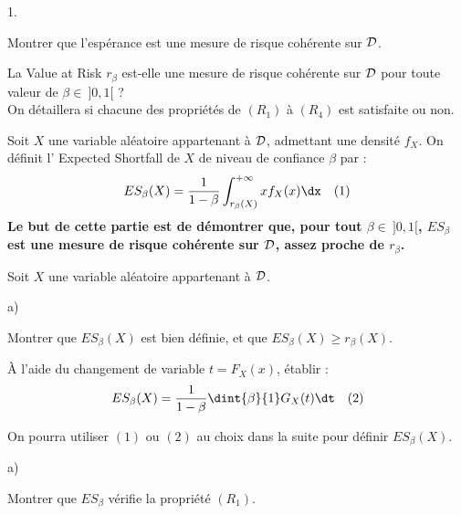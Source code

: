 \begin{noliste}{1.}
  \setlength{\itemsep}{4mm}
  \setcounter{enumi}{11}
  \item Montrer que l'espérance est une mesure de risque cohérente 
  sur ${\cal D}$.
  
  
  
  

  
  \item La \og Value at Risk \fg{} $r_\beta$ est-elle une mesure de 
  risque cohérente sur ${\cal D}$ pour toute valeur de $\beta \in \
  ]0,1[$ ?\\
  On détaillera si chacune des propriétés de $(R_1)$ à $(R_4)$ est 
  satisfaite ou non.
  
  

  Soit $X$ une variable aléatoire appartenant à ${\cal D}$, 
  admettant une densité $f_X$. On définit l' \og Expected 
  Shortfall\fg{} de $X$ de niveau de confiance $\beta$ par :
  \[
    ES_\beta(X)=\dfrac1{1-\beta} \int_{r_\beta(X)}^{+\infty} x 
    f_X(x) \dx \quad(1)
  \]
  {\bf Le but de cette partie est de démontrer que, pour tout 
  $\beta \in \ ]0,1[$, $ES_\beta$ est une mesure de risque cohérente 
  sur ${\cal D}$, assez \og proche \fg{} de $r_\beta$.}
  
  
  \newpage
  
  
  \item Soit $X$ une variable aléatoire appartenant à ${\cal D}$.
  \begin{noliste}{a)}
    \setlength{\itemsep}{2mm}
    \item Montrer que $ES_\beta(X)$ est bien définie, et que 
    $ES_\beta(X) \geq r_\beta(X)$.
    
    
    
    \item À l'aide du changement de variable $t=F_X(x)$, établir :
    \[
      ES_\beta(X)=\dfrac{1}{1-\beta} \dint{\beta}{1} G_X(t) \dt 
      \quad (2)
    \]
    
    
  \end{noliste}
  
  
  
  
  On pourra utiliser $(1)$ ou $(2)$ au choix dans la suite pour 
  définir $ES_\beta(X)$.
  
  \item
  \begin{noliste}{a)}
    \setlength{\itemsep}{2mm}
    \item Montrer que $ES_\beta$ vérifie la propriété $(R_1)$.
    

\end{noliste}
\end{noliste}
